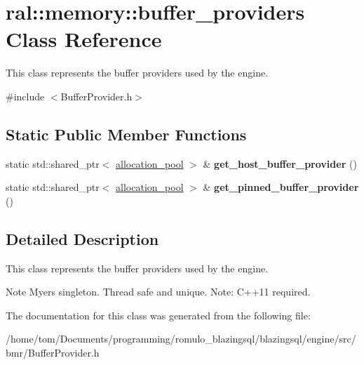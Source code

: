 \hypertarget{classral_1_1memory_1_1buffer__providers}{}\section{ral\+:\+:memory\+:\+:buffer\+\_\+providers Class Reference}
\label{classral_1_1memory_1_1buffer__providers}


This class represents the buffer providers used by the engine.  




{\ttfamily \#include $<$Buffer\+Provider.\+h$>$}

\subsection*{Static Public Member Functions}
\begin{DoxyCompactItemize}
\item 
\mbox{\label{classral_1_1memory_1_1buffer__providers_af3457404f12257d5063ad7bc435a465b}} 
static std\+::shared\+\_\+ptr$<$ \hyperlink{classral_1_1memory_1_1allocation__pool}{allocation\+\_\+pool} $>$ \& {\bfseries get\+\_\+host\+\_\+buffer\+\_\+provider} ()
\item 
\mbox{\label{classral_1_1memory_1_1buffer__providers_a2dd6153c40c21af29056fa00883bde21}} 
static std\+::shared\+\_\+ptr$<$ \hyperlink{classral_1_1memory_1_1allocation__pool}{allocation\+\_\+pool} $>$ \& {\bfseries get\+\_\+pinned\+\_\+buffer\+\_\+provider} ()
\end{DoxyCompactItemize}


\subsection{Detailed Description}
This class represents the buffer providers used by the engine. 

\begin{DoxyNote}{Note}
Myers\textquotesingle{} singleton. Thread safe and unique. Note\+: C++11 required. 
\end{DoxyNote}


The documentation for this class was generated from the following file\+:\begin{DoxyCompactItemize}
\item 
/home/tom/\+Documents/programming/romulo\+\_\+blazingsql/blazingsql/engine/src/bmr/Buffer\+Provider.\+h\end{DoxyCompactItemize}
